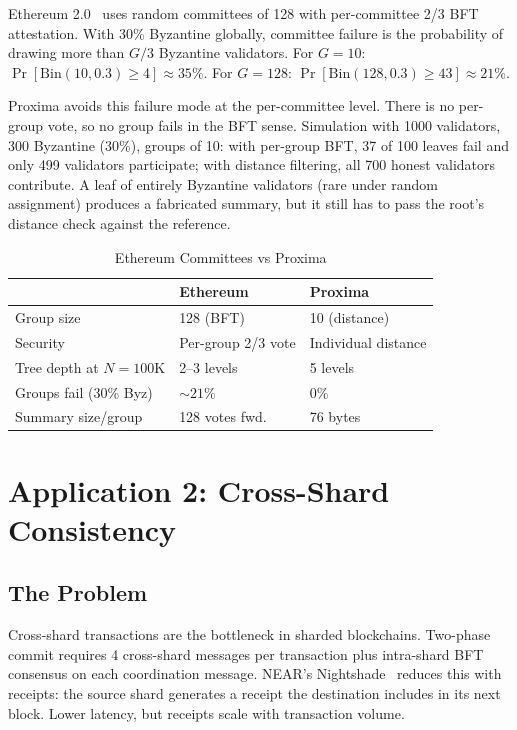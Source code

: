 \documentclass[conference]{IEEEtran}
\begin{document}
Ethereum 2.0~\cite{eth2spec} uses random committees of 128 with per-committee 2/3 BFT attestation. With 30\% Byzantine globally, committee failure is the probability of drawing more than $G/3$ Byzantine validators. For $G{=}10$: $\Pr[\text{Bin}(10, 0.3) \ge 4] \approx 35\%$. For $G{=}128$: $\Pr[\text{Bin}(128, 0.3) \ge 43] \approx 21\%$.

Proxima avoids this failure mode at the per-committee level. There is no per-group vote, so no group fails in the BFT sense. Simulation with 1000 validators, 300 Byzantine (30\%), groups of 10: with per-group BFT, 37 of 100 leaves fail and only 499 validators participate; with distance filtering, all 700 honest validators contribute. A leaf of entirely Byzantine validators (rare under random assignment) produces a fabricated summary, but it still has to pass the root's distance check against the reference.

\begin{table}[!htbp]
  \caption{Ethereum Committees vs Proxima}
  \label{tab:committees}
  \centering
  \small
  \begin{tabular}{@{}lll@{}}
    \toprule
     & \textbf{Ethereum} & \textbf{Proxima} \\
    \midrule
    Group size & 128 (BFT) & 10 (distance) \\
    Security & Per-group 2/3 vote & Individual distance \\
    Tree depth at $N{=}100$K & 2--3 levels & 5 levels \\
    Groups fail (30\% Byz) & $\sim\!21\%$ & $0\%$ \\
    Summary size/group & 128 votes fwd. & 76 bytes \\
    \bottomrule
  \end{tabular}
\end{table}

\section{Application 2: Cross-Shard Consistency}

\subsection{The Problem}

Cross-shard transactions are the bottleneck in sharded blockchains. Two-phase commit requires 4 cross-shard messages per transaction plus intra-shard BFT consensus on each coordination message. NEAR's Nightshade~\cite{nightshade} reduces this with receipts: the source shard generates a receipt the destination includes in its next block. Lower latency, but receipts scale with transaction volume.
\end{document}
